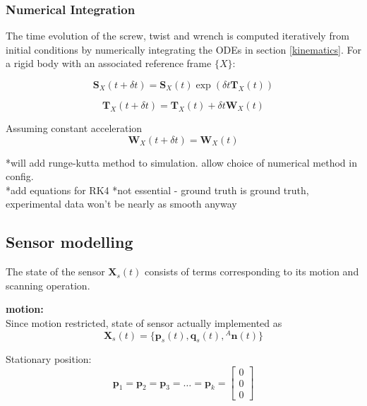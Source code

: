 \subsubsection{Numerical Integration} \label{integration}
The time evolution of the screw, twist and wrench is computed iteratively from initial conditions by numerically integrating the ODEs in section \ref{kinematics}. For a rigid body with an associated reference frame $\{X\}$:

\begin{equation}
	\mathbf{S}_X(t+\delta t) = \mathbf{S}_X(t)\exp({\delta t {\mathbf{T}_X(t)}})
\end{equation}

\begin{equation}
	\mathbf{T}_X(t+\delta t) = \mathbf{T}_X(t) + \delta t \mathbf{W}_X(t)
\end{equation}

Assuming constant acceleration
\begin{equation}
	\mathbf{W}_X(t+\delta t) =\mathbf{W}_X(t)
\end{equation}

*will add runge-kutta method to simulation. allow choice of numerical method in config.\\
*add equations for RK4 
*not essential - ground truth is ground truth, experimental data won't be nearly as smooth anyway

\subsection{Sensor modelling}
The state of the sensor $\mathbf{X}_{s}(t)$ consists of terms corresponding to its motion and scanning operation. 

\textbf{motion:}\\
Since motion restricted, state of sensor actually implemented as 
\begin{equation}
	\mathbf{X}_{s}(t) = \{\mathbf{p}_s(t),\mathbf{q}_s(t),{^{A}\mathbf{n}(t)}\}
\end{equation}

Stationary position:
\begin{equation}
	\mathbf{p}_1 = \mathbf{p}_2 = \mathbf{p}_3 = \dots =  \mathbf{p}_k = 
	\begin{bmatrix}
		0 \\ 0 \\ 0
   	\end{bmatrix}
\end{equation}


